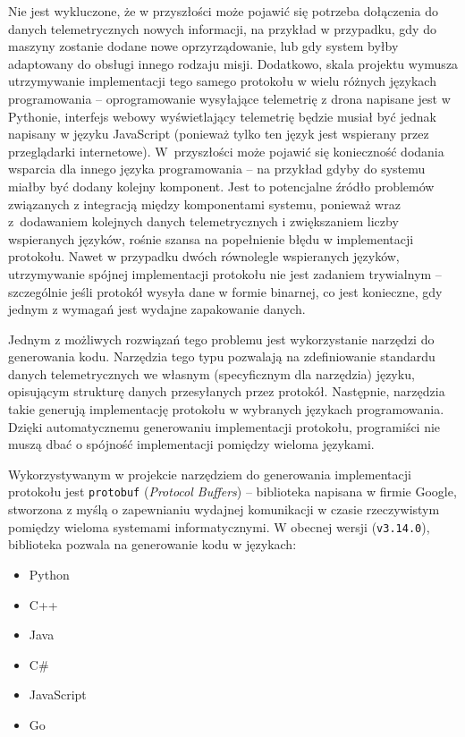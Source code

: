 Nie jest wykluczone, że w przyszłości
może pojawić się potrzeba dołączenia do danych telemetrycznych nowych informacji,
na przykład w przypadku, gdy do maszyny zostanie dodane nowe oprzyrządowanie,
lub gdy system byłby adaptowany do obsługi innego rodzaju misji.
Dodatkowo, skala projektu wymusza utrzymywanie implementacji tego samego protokołu w wielu
różnych językach programowania -- oprogramowanie wysyłające telemetrię z drona napisane
jest w Pythonie, interfejs webowy wyświetlający telemetrię będzie musiał być jednak napisany
w języku JavaScript (ponieważ tylko ten język jest wspierany przez przeglądarki internetowe).
W~przyszłości może pojawić się konieczność dodania wsparcia dla innego języka programowania
-- na przykład gdyby do systemu miałby być dodany kolejny komponent. Jest to potencjalne
źródło problemów związanych z integracją między komponentami systemu, ponieważ wraz
z~dodawaniem kolejnych danych telemetrycznych i zwiększaniem liczby
wspieranych języków, rośnie szansa na popełnienie błędu w implementacji protokołu.
Nawet w przypadku dwóch równolegle wspieranych języków, utrzymywanie spójnej implementacji
protokołu nie jest zadaniem trywialnym -- szczególnie jeśli protokół wysyła dane
w formie binarnej, co jest konieczne, gdy jednym z wymagań jest wydajne zapakowanie danych. 

Jednym z możliwych rozwiązań tego problemu jest wykorzystanie narzędzi do generowania
kodu. Narzędzia tego typu pozwalają na zdefiniowanie standardu danych telemetrycznych
we własnym (specyficznym dla narzędzia) języku, opisującym strukturę danych przesyłanych
przez protokół. Następnie, narzędzia takie generują implementację protokołu w wybranych
językach programowania. Dzięki automatycznemu generowaniu implementacji protokołu,
programiści nie muszą dbać o spójność implementacji pomiędzy wieloma językami.

Wykorzystywanym w projekcie narzędziem do generowania implementacji protokołu jest
\texttt{protobuf} (\textit{Protocol Buffers})\cite{protocol_buffers} -- biblioteka
napisana w firmie Google, stworzona z myślą o zapewnianiu wydajnej komunikacji w czasie
rzeczywistym pomiędzy wieloma systemami informatycznymi. W obecnej wersji
(\texttt{v3.14.0}), biblioteka pozwala na generowanie kodu w językach:

\begin{multicols}{2}
\begin{itemize}
	\item Python
	\item C++
	\item Java
	\item C\#
	\item JavaScript
	\item Go
\end{itemize}
\end{multicols}

